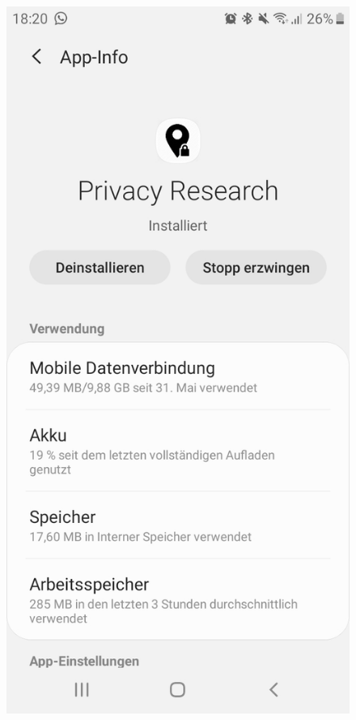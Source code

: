 \begin{figure}
	\centering
	\begin{minipage}{.45\textwidth}
		\begin{center}
		\includegraphics[width=\textwidth]{data/data-usage/data-usage8.jpeg}

\end{center}
\end{minipage}
\end{figure}
